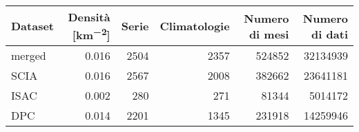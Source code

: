 
\begin{tabular}[t]{lrrrrr}
  \toprule
  Dataset & Densità [\unit{\kilo\meter^{-2}}] & Serie & Climatologie\tnote{*} \tnote{1} & Numero di mesi\tnote{*} \tnote{2} & Numero di dati\tnote{*} \tnote{3}\\
  \midrule
  merged\tnote{\dag} & 0.016 & 2504 & 2357 & 524852 & 32134939\\
  SCIA & 0.016 & 2567 & 2008 & 382662 & 23641181\\
  ISAC\tnote{\dag} & 0.002 & 280 & 271 & 81344 & 5014172\\
  DPC & 0.014 & 2201 & 1345 & 231918 & 14259946\\
  \bottomrule
\end{tabular}
